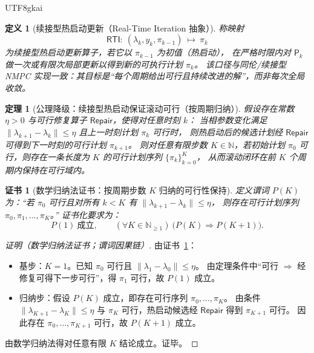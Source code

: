 \documentclass[12pt]{article}
\newtheorem{definition}{定义}[section]
\newtheorem{theorem}{定理}[section]
\newtheorem{Certificate}{证书}[section]
\newcommand{\NN}{\mathbb{N}}
\begin{document}
\begin{CJK*}{UTF8}{gkai}
\begin{definition}[续接型热启动更新（Real-Time Iteration 抽象）]
称映射
\[
  \mathsf{RTI}:\ (\lambda_k,y_k,\pi_{k-1})\ \mapsto\ \pi_k
\]
为续接型热启动更新算子，若它以 $\pi_{k-1}$ 为初值（热启动），
在严格时限内对 $\mathsf{P}_k$ 做一次或有限次局部更新以得到新的可执行计划 $\pi_k$。
该口径与同伦/续接型 NMPC 实现一致：其目标是“每个周期给出可行且持续改进的解”，而非每次全局收敛\cite{ref_syscop_zanelli2017_homotopy_nmpc,ref_merl_tr2018_082}。
\end{definition}

\begin{theorem}[公理降级：续接型热启动保证滚动可行（按周期归纳）]
\label{thm:continuation-ensures-feasible-rolling}
假设存在常数 $\eta>0$ 与可行修复算子 $\mathsf{Repair}$，使得对任意时刻 $k$：
当相参数变化满足 $\|\lambda_{k+1}-\lambda_k\|\le \eta$ 且上一时刻计划 $\pi_k$ 可行时，
则热启动后的候选计划经 $\mathsf{Repair}$ 可得到下一时刻的可行计划 $\pi_{k+1}$。
则对任意有限步数 $K\in\NN$，若初始计划 $\pi_0$ 可行，则存在一条长度为 $K$ 的可行计划序列 $\{\pi_k\}_{k=0}^{K}$，
从而滚动闭环在前 $K$ 个周期内保持在可行域内。
\end{theorem}

\begin{Certificate}[数学归纳法证书：按周期步数 $K$ 归纳的可行性保持]
\label{cert:continuation-ensures-feasible-rolling}
定义谓词 $P(K)$ 为：“若 $\pi_0$ 可行且对所有 $k<K$ 有 $\|\lambda_{k+1}-\lambda_k\|\le\eta$，
则存在可行计划序列 $\pi_0,\pi_1,\dots,\pi_K$。”
证书化要求为：
\[
  P(1)\ \text{成立},\qquad
  (\forall K\in\NN_{\ge 1})\ \bigl(P(K)\Rightarrow P(K+1)\bigr).
\]
\end{Certificate}

\begin{proof}[证明（数学归纳法证书；谓词因果链）]
由证书~\ref{cert:continuation-ensures-feasible-rolling}：
\begin{itemize}
  \item 基步：$K=1$。已知 $\pi_0$ 可行且 $\|\lambda_1-\lambda_0\|\le\eta$。
  由定理条件中“可行 $\Rightarrow$ 经修复可得下一步可行”，得 $\pi_1$ 可行，故 $P(1)$ 成立。
  \item 归纳步：假设 $P(K)$ 成立，即存在可行序列 $\pi_0,\dots,\pi_K$。
  由条件 $\|\lambda_{K+1}-\lambda_K\|\le\eta$ 与 $\pi_K$ 可行，热启动候选经 $\mathsf{Repair}$ 得到 $\pi_{K+1}$ 可行。
  因此存在 $\pi_0,\dots,\pi_{K+1}$ 可行，故 $P(K+1)$ 成立。
\end{itemize}
由数学归纳法得对任意有限 $K$ 结论成立。证毕。
\end{proof}


\end{CJK*}
\end{document}
